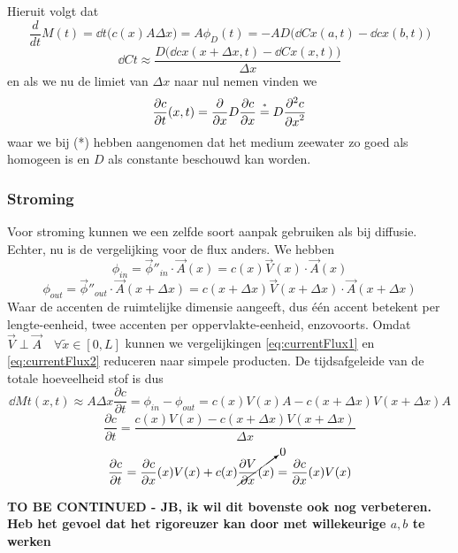Hieruit volgt dat 
\begin{equation}
     \frac{d}{dt}{M}(t) = \dd{}{t} \bigg(c(x) A \Delta x\bigg) = A\phi_{D}(t) = -AD\bigg(\dd{C}{x}(a,t) - \dd{c}{x}(b,t)\bigg)
\end{equation}
\begin{equation}
    \dd{C}{t} \approx  \frac{D\bigg(\dd{c}{x}(x+\Delta x,t) - \dd{C}{x}(x,t)\bigg)}{\Delta x}
\end{equation}
en als we nu de limiet van $\Delta x$ naar nul nemen vinden we 
\begin{equation}
    \dd{c}{t}(x,t) = \dd{}{x}D\dd{c}{x} \overEquals{*} D\ddn{c}{x}{2}
\end{equation}
waar we bij (*) hebben aangenomen dat het medium zeewater zo goed als homogeen is en $D$ als constante beschouwd kan worden.

\newpage
\subsubsection{Stroming}
Voor stroming kunnen we een zelfde soort aanpak gebruiken als bij diffusie. Echter, nu is de vergelijking voor de flux anders. We hebben
\begin{equation}\phi_{in} = \vec{\phi}''_{in}  \cdot \vec{A}(x)=  c(x)\vec{V}(x) \cdot \vec{A}(x)
\label{eq:currentFlux1}
\end{equation}
\begin{equation}\phi_{out} = \vec{\phi}''_{out}\cdot \vec{A}(x+\Delta x) = c(x+\Delta x)\vec{V}(x+\Delta x) \cdot \vec{A}(x+\Delta x)
\label{eq:currentFlux2}
\end{equation}
Waar de accenten de ruimtelijke dimensie aangeeft, dus één accent betekent per lengte-eenheid, twee accenten per oppervlakte-eenheid, enzovoorts. Omdat $\vec{V} \perp \vec{A} \quad \forall \tilde{x} \in [0,L]$ kunnen we vergelijkingen \ref{eq:currentFlux1} en \ref{eq:currentFlux2} reduceren naar simpele producten. De tijdsafgeleide van de totale hoeveelheid stof is dus
\begin{equation}
    \dd{M}{t}(x,t) \approx A\Delta x\frac{\partial c}{\partial t} =  \phi_{in} - \phi_{out} = c(x)V(x)A - c(x+\Delta x)V(x+\Delta x)A
\end{equation} 
\begin{equation} \frac{\partial c}{\partial t} =  \frac{c(x)V(x) - c(x+\Delta x)V(x+\Delta x)}{\Delta x}
\end{equation}
\begin{equation} \frac{\partial c}{\partial t} =  \frac{\partial c}{\partial x}(x)V(x) + c(x)\cancelto{0}{\frac{\partial V}{\partial x}(x)} = \frac{\partial c}{\partial x}(x)V(x)
\end{equation}

\textbf{TO BE CONTINUED - JB, ik wil dit bovenste ook nog verbeteren. Heb het gevoel dat het rigoreuzer kan door met willekeurige $a,b$ te werken}
